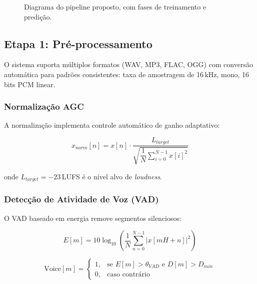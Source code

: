 \documentclass[12pt,a4paper]{article}
\begin{document}
\begin{figure}[H]
\caption{Diagrama do pipeline proposto, com fases de treinamento e
predi\c{c}\~{a}o.}
\label{fig:pipeline}
\end{figure}

\subsection{Etapa 1: Pr\'{e}-processamento}

O sistema suporta m\'{u}ltiplos formatos (WAV, MP3, FLAC, OGG) com
convers\~{a}o autom\'{a}tica para padr\~{o}es consistentes: taxa de amostragem
de 16\,kHz, mono, 16\,bits PCM linear.

\subsubsection{Normaliza\c{c}\~{a}o AGC}

A normaliza\c{c}\~{a}o implementa controle autom\'{a}tico de ganho adaptativo:

\begin{equation}
x_{norm}[n] = x[n] \cdot
\frac{L_{target}}{\sqrt{\dfrac{1}{N}\displaystyle\sum_{i=0}^{N-1}x[i]^2}}
\end{equation}

onde $L_{target} = -23$\,LUFS \'{e} o n\'{i}vel alvo de \textit{loudness}.

\subsubsection{Detec\c{c}\~{a}o de Atividade de Voz (VAD)}

O VAD baseado em energia remove segmentos silenciosos:

\begin{equation}
E[m] = 10\log_{10}\!\left(\frac{1}{N}\sum_{n=0}^{N-1}|x[mH+n]|^2\right)
\end{equation}

\begin{equation}
\text{Voice}[m] = \begin{cases}
1, & \text{se } E[m] > \theta_{VAD} \text{ e } D[m] > D_{min}\\
0, & \text{caso contr\'{a}rio}
\end{cases}
\end{equation}
\end{document}
